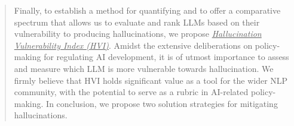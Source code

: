 \documentclass[11pt]{article}
\begin{document}
\begin{abstract}
Finally, to establish a method for quantifying and to offer a comparative spectrum that allows us to evaluate and rank LLMs based on their vulnerability to producing hallucinations, we propose \emph{\ul{Hallucination Vulnerability Index (HVI)}}. Amidst the extensive deliberations on policy-making for regulating AI development, it is of utmost importance to assess and measure which LLM is more vulnerable towards hallucination. We firmly believe that HVI holds significant value as a tool for the wider NLP community, with the potential to serve as a rubric in AI-related policy-making. In conclusion, we propose two solution strategies for mitigating hallucinations.


\end{abstract}
\end{document}
